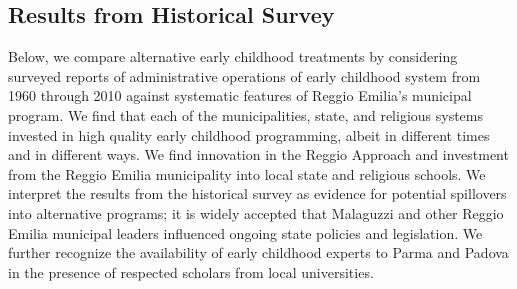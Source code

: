\subsection{Results from Historical Survey}

Below, we compare alternative early childhood treatments by considering surveyed reports of administrative operations of early childhood system from 1960 through 2010 against systematic features of Reggio Emilia's municipal program. We find that each of the municipalities, state, and religious systems invested in high quality early childhood programming, albeit in different times and in different ways. We find innovation in the Reggio Approach and investment from the Reggio Emilia municipality into local state and religious schools. We interpret the results from the historical survey as evidence for potential spillovers into alternative programs; it is widely accepted that Malaguzzi and other Reggio Emilia municipal leaders influenced ongoing state policies and legislation. We further recognize the availability of early childhood experts to Parma and Padova in the presence of respected scholars from local universities.

